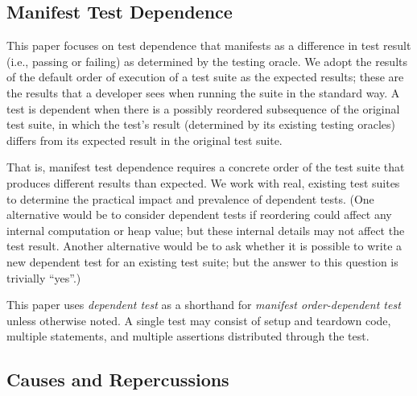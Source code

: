 
\subsection{Manifest Test Dependence}

This paper focuses on test
dependence that manifests as a
difference in test result (i.e., passing or failing) as determined by the testing oracle.
We adopt the results of the default
order of execution of a test suite as the
expected results; these are the results that a developer sees when running
the suite in the standard way. A test is dependent when there is a possibly
reordered subsequence of the original test suite, in which
the test's result (determined by its existing testing
oracles) differs from its expected result in the
original test suite.

That is, manifest test dependence
requires a concrete order of the test suite that
produces {different} results than expected.  
%
We work with real, existing test suites to determine the practical impact
and prevalence of dependent tests.
%
(One alternative would be to consider dependent tests if reordering could
affect any internal computation or heap value; but these internal details
may not affect the test result.  Another alternative would be to ask
whether it is possible to write a new dependent test for an existing
test suite; but the answer to this question is trivially ``yes''.)


This paper uses \textit{dependent test} as a shorthand for
\textit{manifest order-dependent test}
unless otherwise noted.
A single test may consist of setup and teardown
code, multiple statements, and multiple assertions
distributed through the test.




\subsection{Causes and Repercussions}
\label{sec:intro-repercussions}

